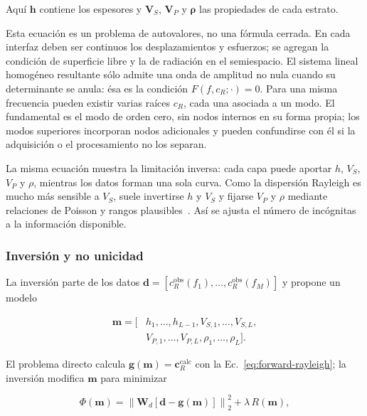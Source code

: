 Aquí $\boldsymbol{h}$ contiene los espesores y $\boldsymbol{V}_S$,
$\boldsymbol{V}_P$ y $\boldsymbol{\rho}$ las propiedades de cada estrato.

Esta ecuación es un problema de autovalores, no una fórmula cerrada. En cada interfaz
deben ser continuos los desplazamientos y esfuerzos; se agregan la condición de
superficie libre y la de radiación en el semiespacio. El sistema lineal homogéneo
resultante sólo admite una onda de amplitud no nula cuando su determinante se anula:
ésa es la condición $F(f,c_R;\cdot)=0$. Para una misma frecuencia pueden existir varias
raíces $c_R$, cada una asociada a un modo. El fundamental es el modo de orden cero, sin
nodos internos en su forma propia; los modos superiores incorporan nodos adicionales y
pueden confundirse con él si la adquisición o el procesamiento no los separan.

La misma ecuación muestra la limitación inversa: cada capa puede aportar $h$, $V_S$,
$V_P$ y $\rho$, mientras los datos forman una sola curva. Como la dispersión Rayleigh
es mucho más sensible a $V_S$, suele invertirse $h$ y $V_S$ y fijarse $V_P$ y $\rho$
mediante relaciones de Poisson y rangos plausibles~\cite{Xia1999}. Así se ajusta el
número de incógnitas a la información disponible.

\subsubsection{Inversión y no unicidad}

La inversión parte de los datos
$\boldsymbol{d}=[c_R^{\mathrm{obs}}(f_1),\ldots,c_R^{\mathrm{obs}}(f_M)]$ y propone un
modelo

\begin{equation}
\begin{split}
    \boldsymbol{m}=[&h_1,\ldots,h_{L-1},
    V_{S,1},\ldots,V_{S,L},\\
    &V_{P,1},\ldots,V_{P,L},
    \rho_1,\ldots,\rho_L].
\end{split}
\end{equation}

El problema directo calcula
$\boldsymbol{g}(\boldsymbol{m})=\boldsymbol{c}_R^{\mathrm{calc}}$ con la
Ec.~\eqref{eq:forward-rayleigh}; la inversión modifica $\boldsymbol{m}$ para minimizar

\begin{equation}
    \Phi(\boldsymbol{m})=
    \left\|\boldsymbol{W}_d
    [\boldsymbol{d}-\boldsymbol{g}(\boldsymbol{m})]\right\|_2^2
    +\lambda\,R(\boldsymbol{m}),
    \label{eq:objetivo-inversion}
\end{equation}


